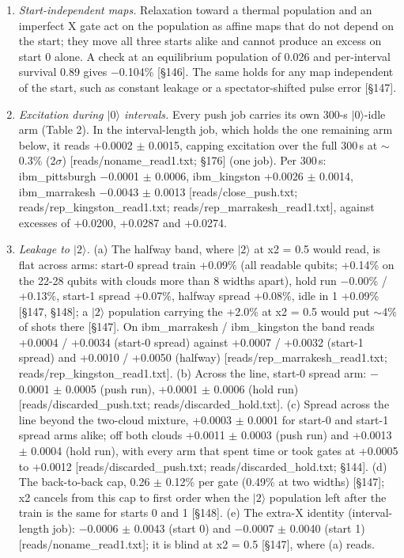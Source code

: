 \documentclass[11pt]{article}
\begin{document}
\begin{enumerate}
\item \emph{Start-independent maps.} Relaxation toward a thermal population and an imperfect X gate act on the population as affine maps that do not depend on the start; they move all three starts alike and cannot produce an excess on start 0 alone. A check at an equilibrium population of 0.026 and per-interval survival 0.89 gives \(-\)0.104\% {[}\S{}146{]}. The same holds for any map independent of the start, such as constant leakage or a spectator-shifted pulse error {[}\S{}147{]}.
\item \emph{Excitation during \(|0\rangle\) intervals.} Every push job carries its own 300-\textmu s \(|0\rangle\)-idle arm (Table 2). In the interval-length job, which holds the one remaining arm below, it reads +0.0002 \(\pm\) 0.0015, capping excitation over the full 300\,\textmu s at \(\sim\)0.3\% (2\(\sigma\)) {[}reads/noname\_read1.txt; \S{}176{]} (one job). Per 300\,\textmu s: ibm\_pittsburgh \(-\)0.0001 \(\pm\) 0.0006, ibm\_kingston +0.0026 \(\pm\) 0.0014, ibm\_marrakesh \(-\)0.0043 \(\pm\) 0.0013 {[}reads/close\_push.txt; reads/rep\_kingston\_read1.txt; reads/rep\_marrakesh\_read1.txt{]}, against excesses of +0.0200, +0.0287 and +0.0274.
\item \emph{Leakage to \(|2\rangle\).} (a) The halfway band, where \(|2\rangle\) at x2 = 0.5 would read, is flat across arms: start-0 spread train +0.09\% (all readable qubits; +0.14\% on the 22-28 qubits with clouds more than 8 widths apart), hold run \(-\)0.00\% / +0.13\%, start-1 spread +0.07\%, halfway spread +0.08\%, idle in 1 +0.09\% {[}\S{}147, \S{}148{]}; a \(|2\rangle\) population carrying the +2.0\% at x2 = 0.5 would put \(\sim\)4\% of shots there {[}\S{}147{]}. On ibm\_marrakesh / ibm\_kingston the band reads +0.0004 / +0.0034 (start-0 spread) against +0.0007 / +0.0032 (start-1 spread) and +0.0010 / +0.0050 (halfway) {[}reads/rep\_marrakesh\_read1.txt; reads/rep\_kingston\_read1.txt{]}. (b) Across the line, start-0 spread arm: \(-\)0.0001 \(\pm\) 0.0005 (push run), +0.0001 \(\pm\) 0.0006 (hold run) {[}reads/discarded\_push.txt; reads/discarded\_hold.txt{]}. (c) Spread across the line beyond the two-cloud mixture, +0.0003 \(\pm\) 0.0001 for start-0 and start-1 spread arms alike; off both clouds +0.0011 \(\pm\) 0.0003 (push run) and +0.0013 \(\pm\) 0.0004 (hold run), with every arm that spent time or took gates at +0.0005 to +0.0012 {[}reads/discarded\_push.txt; reads/discarded\_hold.txt; \S{}144{]}. (d) The back-to-back cap, 0.26 \(\pm\) 0.12\% per gate (0.49\% at two widths) {[}\S{}147{]}; x2 cancels from this cap to first order when the \(|2\rangle\) population left after the train is the same for starts 0 and 1 {[}\S{}148{]}. (e) The extra-X identity (interval-length job): \(-\)0.0006 \(\pm\) 0.0043 (start 0) and \(-\)0.0007 \(\pm\) 0.0040 (start 1) {[}reads/noname\_read1.txt{]}; it is blind at x2 = 0.5 {[}\S{}147{]}, where (a) reads.

\end{enumerate}
\end{document}
